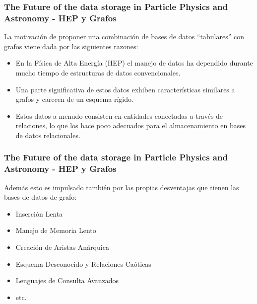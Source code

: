 \begin{frame}
    \frametitle{The Future of the data storage in Particle Physics and Astronomy - HEP y Grafos}

    La motivación de proponer una combinación de bases de datos ``tabulares'' con grafos viene dada por las siguientes razones:

     
    
    \begin{itemize}
        \item En la Física de Alta Energía (HEP) el manejo de datos ha dependido durante mucho tiempo de estructuras de datos convencionales.

          
    
        \item Una parte significativa de estos datos exhiben características similares a grafos y carecen de un esquema rígido.

         

        \item Estos datos a menudo consisten en entidades conectadas a través de relaciones, lo que los hace poco adecuados para el almacenamiento en bases de datos relacionales.
    \end{itemize}
\end{frame}

\begin{frame}
    \frametitle{The Future of the data storage in Particle Physics and Astronomy - HEP y Grafos}

    Además esto es impulsado también por las propias desventajas que tienen las bases de datos de grafo:

     
    
    \begin{itemize}
        \item Inserción Lenta
        \item Manejo de Memoria Lento
        \item Creación de Aristas Anárquica
        \item Esquema Desconocido y Relaciones Caóticas
        \item Lenguajes de Consulta Avanzados
        \item etc. 
    \end{itemize}
\end{frame}

